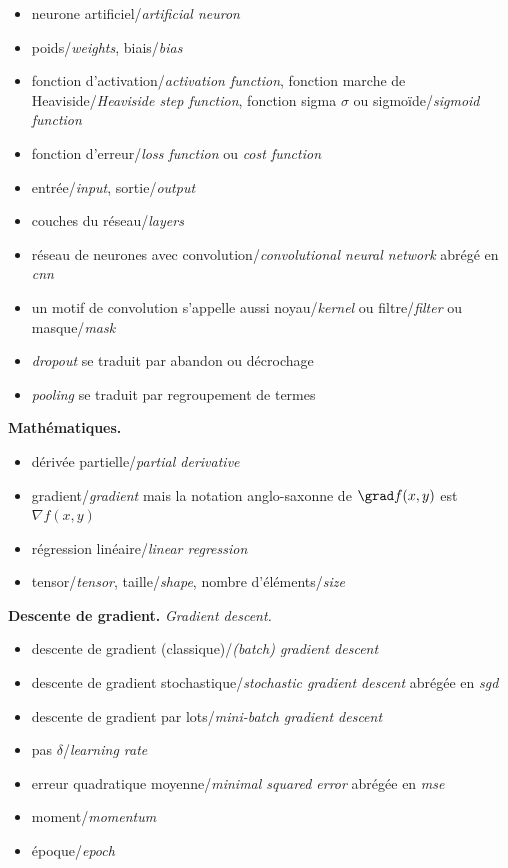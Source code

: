 \documentclass[11pt,class=report,crop=false]{standalone}
\begin{document}
\begin{itemize}
  \item neurone artificiel/\emph{artificial neuron}
  \item poids/\emph{weights}, biais/\emph{bias}
  \item fonction d'activation/\emph{activation function}, fonction marche de Heaviside/\emph{Heaviside step function}, fonction sigma $\sigma$ ou sigmoïde/\emph{sigmoid function}
  \item fonction d'erreur/\emph{loss function} ou \emph{cost function}
  \item entrée/\emph{input}, sortie/\emph{output}
  \item couches du réseau/\emph{layers}
  \item réseau de neurones avec convolution/\emph{convolutional neural network} abrégé en \emph{cnn}
  \item un motif de convolution s'appelle aussi noyau/\emph{kernel} ou filtre/\emph{filter}
 ou masque/\emph{mask}
  \item \emph{dropout} se traduit par abandon ou décrochage
  \item \emph{pooling} se traduit par regroupement de termes
\end{itemize} 
 
\medskip

\textbf{Mathématiques.}

\begin{itemize}
  \item dérivée partielle/\emph{partial derivative}
  \item gradient/\emph{gradient} mais la notation anglo-saxonne de $\grad f(x,y)$ est $\nabla f(x,y)$
  \item régression linéaire/\emph{linear regression}
  \item tensor/\emph{tensor}, taille/\emph{shape}, nombre d'éléments/\emph{size}
\end{itemize} 
 
 
\medskip
 
\textbf{Descente de gradient.} \emph{Gradient descent.}

\begin{itemize}
 \item descente de gradient (classique)/\emph{(batch) gradient descent}
 \item descente de gradient stochastique/\emph{stochastic gradient descent} abrégée en \emph{sgd}
 \item descente de gradient par lots/\emph{mini-batch gradient descent}
 \item pas $\delta$/\emph{learning rate}
 \item erreur quadratique moyenne/\emph{minimal squared error} abrégée en \emph{mse}
 \item moment/\emph{momentum}
 \item époque/\emph{epoch}
\end{itemize}  
\end{document}
